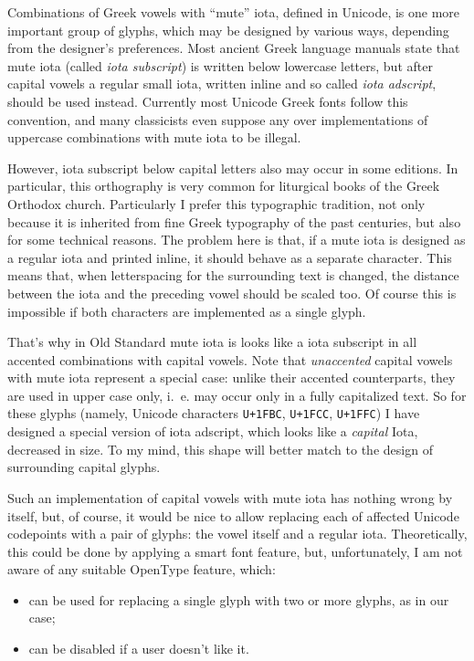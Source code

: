 \documentclass[12pt,a4paper,openany]{book}
\begin{document}
Combinations of Greek vowels with “mute” iota, defined in Unicode, is one
more important group of glyphs, which may be designed by various ways,
depending from the designer’s preferences. Most ancient Greek language
manuals state that mute iota (called \textit{iota subscript}) is written
below lowercase letters, but after capital vowels a regular small iota,
written inline and so called \textit{iota adscript}, should be used
instead.  Currently most Unicode Greek fonts follow this convention, and
many classicists even suppose any over implementations of uppercase
combinations with mute iota to be illegal.

However, iota subscript below capital letters also may occur in some
editions. In particular, this orthography is very common for liturgical
books of the Greek Orthodox church. Particularly I prefer this typographic
tradition, not only because it is inherited from fine Greek typography of
the past centuries, but also for some technical reasons. The problem here
is that, if a mute iota is designed as a regular iota and printed inline,
it should behave as a separate character. This means that, when
letterspacing for the surrounding text is changed, the distance between the
iota and the preceding vowel should be scaled too. Of course this is
impossible if both characters are implemented as a single glyph.

That’s why in Old Standard mute iota is looks like a iota subscript in
all accented combinations with capital vowels. Note that \textit{unaccented}
capital vowels with mute iota represent a special case: unlike their
accented counterparts, they are used in upper case only, i.~e. may occur
only in a fully capitalized text. So for these glyphs (namely, Unicode
characters \texttt{U+1FBC}, \texttt{U+1FCC}, \texttt{U+1FFC}) I have designed a special version of
iota adscript, which looks like a \textit{capital} Iota, decreased in size.
To my mind, this shape will better match to the design of surrounding
capital glyphs.

Such an implementation of capital vowels with mute iota has nothing wrong
by itself, but, of course, it would be nice to allow replacing each of
affected Unicode codepoints with a pair of glyphs: the vowel itself and a
regular iota. Theoretically, this could be done by applying a smart font
feature, but, unfortunately, I am not aware of any suitable OpenType
feature, which:

\begin{itemize}

\item can be used for replacing a single glyph with two or more glyphs, as in
our case;

\item can be disabled if a user doesn’t like it.

\end{itemize}
\end{document}
